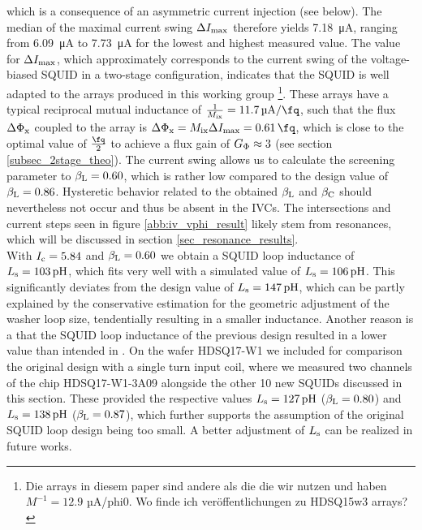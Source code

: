 which is a consequence of an asymmetric current injection (see below). The median of the maximal current swing $\Delta I_{\rm max}$ therefore yields \qty{7.18}{\micro\ampere}, ranging from \qty{6.09}{\micro\ampere} to \qty{7.73}{\micro\ampere} for the lowest and highest measured value. The value for $\Delta I_{\rm max}$, which approximately corresponds to the current swing of the voltage-biased SQUID in a two-stage configuration, indicates that the SQUID is well adapted to the arrays produced in this working group \cite{Kempf2015}\footnote{Die arrays in diesem paper sind andere als die die wir nutzen und haben $M^{-1}=12.9$ µA/phi0. Wo finde ich veröffentlichungen zu HDSQ15w3 arrays?}. These arrays have a typical reciprocal mutual inductance of $\frac{1}{M_{\rm ix}}=\qty{11.7}{\micro\ampere\per\fq}$, such that the flux $\Delta\Phi_{\rm x}$ coupled to the array is $\Delta\Phi_{\rm x}=M_{\rm ix}\Delta I_{\rm max}=\qty{0.61}{\fq}$, which is close to the optimal value of $\frac{\unit{\fq}}{2}$ to achieve a flux gain of $G_{\rm \Phi}\approx 3$ (see section \ref{subsec_2stage_theo}). The current swing allows us to calculate the screening parameter to $\beta_{\rm L}=0.60$, which is rather low compared to the design value of $\beta_{\rm L}=0.86$. Hysteretic behavior related to the obtained $\beta_{\rm L}$ and $\beta_{\rm C}$ should nevertheless not occur and thus be absent in the IVCs. The intersections and current steps seen in figure \ref{abb:iv_vphi_result} likely stem from resonances, which will be discussed in section \ref{sec_resonance_results}. \\ 

With $I_{\rm c}=5.84$ and $\beta_{\rm L}=0.60$ we obtain a SQUID loop inductance of $L_{\rm s}=\qty{103}{\pico\henry}$, which fits very well with a simulated value of $L_{\rm s}=\qty{106}{\pico\henry}$. This significantly deviates from the design value of $L_{\rm s}=\qty{147}{\pico\henry}$, which can be partly explained by the conservative estimation for the geometric adjustment of the washer loop size, tendentially resulting in a smaller inductance. Another reason is a that the SQUID loop inductance of the previous design resulted in a lower value than intended in \cite{Bauer2022}. On the wafer HDSQ17-W1 we included for comparison the original design with a single turn input coil, where we measured two channels of the chip HDSQ17-W1-3A09 alongside the other 10 new SQUIDs discussed in this section. These provided the respective values $L_{\rm s}=\qty{127}{\pico\henry}$ ($\beta_{\rm L}=0.80$) and $L_{\rm s}=\qty{138}{\pico\henry}$ ($\beta_{\rm L}=0.87$), which further supports the assumption of the original SQUID loop design being too small. A better adjustment of $L_{\rm s}$ can be realized in future works. \\ 
 
